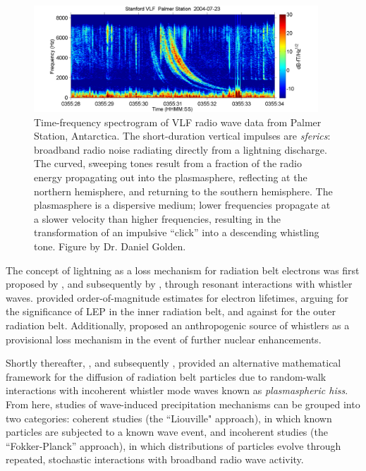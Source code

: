 \begin{figure}[t]
\begin{center}
\includegraphics[width=0.95\textwidth]{figures/Whistler_radio_palmer_2004-07-23_T035528.png}

\caption[An example of a lightning-generated whistler wave]{Time-frequency spectrogram of VLF radio wave data from Palmer Station, Antarctica. The short-duration vertical impulses are \emph{sferics}: broadband radio noise radiating directly from a lightning discharge. The curved, sweeping tones result from a fraction of the radio energy propagating out into the plasmasphere, reflecting at the northern hemisphere, and returning to the southern hemisphere. The plasmasphere is a dispersive medium; lower frequencies propagate at a slower velocity than higher frequencies, resulting in the transformation of an impulsive ``click'' into a descending whistling tone. Figure by Dr. Daniel Golden.\footnotemark[2] }
\label{fig:whistlers}
\end{center}
\end{figure}

The concept of lightning as a loss mechanism for radiation belt electrons was first proposed by \cite{Dungey1963}, and subsequently by \cite{Cornwall1964}, through resonant interactions with whistler waves. \citeauthor{Dungey1963} provided order-of-magnitude estimates for electron lifetimes, arguing for the significance of LEP in the inner radiation belt, and against for the outer radiation belt. Additionally, \citeauthor{Dungey1963} proposed an anthropogenic source of whistlers as a provisional loss mechanism in the event of further nuclear enhancements. 

Shortly thereafter, \cite{Kennel1966b}, and subsequently \cite{Lyons1973}, provided an alternative mathematical framework for the diffusion of radiation belt particles due to random-walk interactions with incoherent whistler mode waves known as \emph{plasmaspheric hiss}. From here, studies of wave-induced precipitation mechanisms can be grouped into two categories: coherent studies (the ``Liouville" approach), in which known particles are subjected to a known wave event, and incoherent studies (the ``Fokker-Planck'' approach), in which distributions of particles evolve through repeated, stochastic interactions with broadband radio wave activity.


